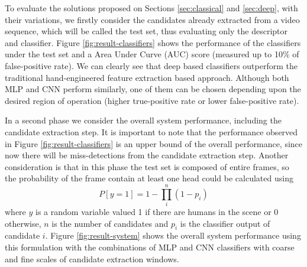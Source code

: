     To evaluate the solutions proposed on Sections \ref{sec:classical} and \ref{sec:deep}, with their variations, we firstly consider the candidates already extracted from a video sequence, which will be called the test set, thus evaluating only the descriptor and classifier. Figure \ref{fig:result-classifiers} shows the performance of the classifiers under the test set and a Area Under Curve (AUC) score \cite{evaluationMetrics} (measured up to 10\% of false-positive rate). We can clearly see that deep based classifiers outperform the traditional hand-engineered feature extraction based approach. Although both MLP and CNN perform similarly, one of them can be chosen depending upon the desired region of operation (higher true-positive rate or lower false-positive rate).

    \begin{figure*}[!t]
    \centering
    \label{fig:result-classifiers-all}
    \hfil
    \caption{Classifiers performance.}
    \label{fig:result-classifiers}
    \end{figure*}
    In a second phase we consider the overall system performance, including the candidate extraction step. It is important to note that the performance observed in Figure \ref{fig:result-classifiers} is an upper bound of the overall performance, since now there will be miss-detections from the candidate extraction step. Another consideration is that in this phase the test set is composed of entire frames, so the probability of the frame contain at least one head could be calculated using
    \begin{equation}
    P[y=1] = 1 - \prod_i^n (1-p_i)
    \end{equation}
    where $y$ is a random variable valued 1 if there are humans in the scene or 0 otherwise, $n$ is the number of candidates and $p_i$ is the classifier output of candidate $i$. Figure \ref{fig:result-system} shows the overall system performance using this formulation with the combinations of MLP and CNN classifiers with coarse and fine scales of candidate extraction windows.


